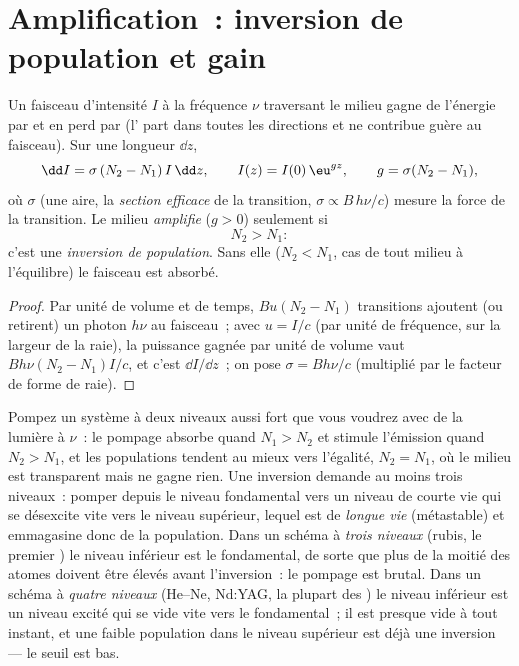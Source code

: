 \section{Amplification~: inversion de population et gain}

\begin{proposition}\label{prop:b2:laser:gain}
Un faisceau d'intensité $I$ à la fréquence $\nu$ traversant le milieu
gagne de l'énergie par  et en perd par 
(l' part dans toutes les directions et ne contribue guère
au faisceau). Sur une longueur $\dd z$,
\[
\dd I = \sigma\,(N_2 - N_1)\,I\,\dd z, \qquad
I(z) = I(0)\,\eu^{g z}, \qquad g = \sigma(N_2 - N_1),
\]
où $\sigma$ (une aire, la \emph{section efficace} de la transition, $\sigma \propto B\,h\nu/c$) mesure
la force de la transition. Le milieu \emph{amplifie} ($g > 0$)
seulement si
\[
N_2 > N_1 :
\]
c'est une \emph{inversion de population}. Sans elle
($N_2 < N_1$, cas de tout milieu à l'équilibre) le faisceau est
absorbé.
\end{proposition}

\begin{proof}
Par unité de volume et de temps, $B u (N_2 - N_1)$ transitions ajoutent (ou retirent)
un photon $h\nu$ au faisceau~; avec $u = I/c$ (par unité de fréquence, sur
la largeur de la raie), la puissance gagnée par unité de volume vaut
$B h\nu (N_2 - N_1) I/c$, et c'est $\dd I/\dd z$~; on pose $\sigma =
Bh\nu/c$ (multiplié par le facteur de forme de raie).
\end{proof}

\begin{remark}\label{rem:b2:laser:twolevel}
Pompez un système à deux niveaux aussi fort que vous voudrez avec de la lumière à $\nu$~: le
pompage absorbe quand $N_1 > N_2$ et stimule l'émission quand $N_2 > N_1$,
et les populations tendent au mieux vers l'égalité, $N_2 = N_1$, où le
milieu est transparent mais ne gagne rien. Une inversion demande au moins
trois niveaux~: pomper depuis le niveau fondamental vers un niveau de courte vie qui
se désexcite vite vers le niveau  supérieur, lequel est de \emph{longue vie}
(métastable) et emmagasine donc de la population. Dans un
schéma à \emph{trois niveaux} (rubis, le premier
) le niveau  inférieur est le fondamental, de sorte que plus de la moitié
des atomes doivent être élevés avant l'inversion~: le pompage est brutal. Dans un
schéma à \emph{quatre niveaux} (He--Ne, Nd:YAG, la plupart
des ) le niveau  inférieur est un niveau excité qui se vide vite
vers le fondamental~; il est presque vide à tout instant, et une faible
population dans le niveau supérieur est déjà une inversion --- le seuil
est bas.
\end{remark}


